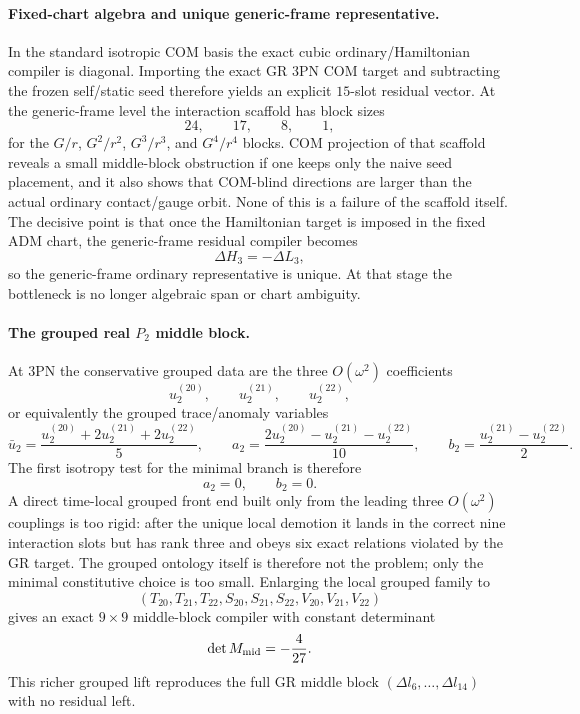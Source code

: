 \documentclass[11pt]{article}
\begin{document}
\paragraph{Fixed-chart algebra and unique generic-frame representative.}
In the standard isotropic COM basis the exact cubic ordinary/Hamiltonian compiler
is diagonal.  Importing the exact GR $3$PN COM target and subtracting the frozen
self/static seed therefore yields an explicit $15$-slot residual vector.  At the
generic-frame level the interaction scaffold has block sizes
\[
24,\qquad 17,\qquad 8,\qquad 1,
\]
for the $G/r$, $G^2/r^2$, $G^3/r^3$, and $G^4/r^4$ blocks.  COM projection of
that scaffold reveals a small middle-block obstruction if one keeps only the
naive seed placement, and it also shows that COM-blind directions are larger than
the actual ordinary contact/gauge orbit.  None of this is a failure of the
scaffold itself.  The decisive point is that once the Hamiltonian target is
imposed in the fixed ADM chart, the generic-frame residual compiler becomes
\[
\Delta H_3=-\Delta L_3,
\]
so the generic-frame ordinary representative is unique.  At that stage the
bottleneck is no longer algebraic span or chart ambiguity.

\paragraph{The grouped real \texorpdfstring{$P_2$}{P 2} middle block.}
At $3$PN the conservative grouped data are the three $O(\omega^2)$ coefficients
\[
u_2^{(20)},\qquad u_2^{(21)},\qquad u_2^{(22)},
\]
or equivalently the grouped trace/anomaly variables
\[
\bar u_2=\frac{u_2^{(20)}+2u_2^{(21)}+2u_2^{(22)}}{5},
\qquad
 a_2=\frac{2u_2^{(20)}-u_2^{(21)}-u_2^{(22)}}{10},
\qquad
 b_2=\frac{u_2^{(21)}-u_2^{(22)}}{2}.
\]
The first isotropy test for the minimal branch is therefore
\[
a_2=0,
\qquad
b_2=0.
\]
A direct time-local grouped front end built only from the leading three
$O(\omega^2)$ couplings is too rigid: after the unique local demotion it lands in
the correct nine interaction slots but has rank three and obeys six exact
relations violated by the GR target.  The grouped ontology itself is therefore
not the problem; only the minimal constitutive choice is too small.  Enlarging
the local grouped family to
\[
(T_{20},T_{21},T_{22},S_{20},S_{21},S_{22},V_{20},V_{21},V_{22})
\]
gives an exact $9\times 9$ middle-block compiler with constant determinant
\[
\det M_{\rm mid}=-\frac4{27}.
\]
This richer grouped lift reproduces the full GR middle block
\((\Delta l_6,\dots,\Delta l_{14})\) with no residual left.
\end{document}
